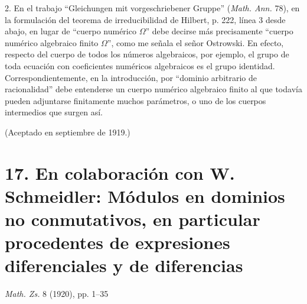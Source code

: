 \documentclass[11pt]{article}
\begin{document}
2. En el trabajo ``Gleichungen mit vorgeschriebener Gruppe'' (\emph{Math. Ann.} 78), en la formulación del teorema de irreducibilidad de Hilbert, p. 222, línea 3 desde abajo, en lugar de ``cuerpo numérico \(\Omega\)'' debe decirse más precisamente ``cuerpo numérico algebraico finito \(\Omega\)'', como me señala el señor Ostrowski. En efecto, respecto del cuerpo de todos los números algebraicos, por ejemplo, el grupo de toda ecuación con coeficientes numéricos algebraicos es el grupo identidad. Correspondientemente, en la introducción, por ``dominio arbitrario de racionalidad'' debe entenderse un cuerpo numérico algebraico finito al que todavía pueden adjuntarse finitamente muchos parámetros, o uno de los cuerpos intermedios que surgen así.

\begin{center}
(Aceptado en septiembre de 1919.)
\end{center}



\clearpage
\providecommand{\mM}{\mathfrak{M}}
\providecommand{\mN}{\mathfrak{N}}
\providecommand{\mL}{\mathfrak{L}}
\providecommand{\mG}{\mathfrak{G}}
\providecommand{\mA}{\mathfrak{A}}
\providecommand{\mB}{\mathfrak{B}}
\providecommand{\mX}{\mathfrak{X}}
\providecommand{\mY}{\mathfrak{Y}}
\providecommand{\mU}{\mathfrak{U}}
\providecommand{\mP}{\mathfrak{P}}
\providecommand{\mQ}{\mathfrak{Q}}
\providecommand{\mS}{\mathfrak{S}}
\providecommand{\mD}{\mathfrak{D}}
\providecommand{\mR}{\mathfrak{R}}
\providecommand{\mV}{\mathfrak{V}}
\providecommand{\ma}{\mathfrak{a}}
\providecommand{\mb}{\mathfrak{b}}
\providecommand{\mx}{\mathfrak{x}}
\providecommand{\my}{\mathfrak{y}}
\providecommand{\mz}{\mathfrak{z}}
\providecommand{\me}{\mathfrak{e}}
\providecommand{\mbarA}{\overline{\mathfrak{A}}}
\providecommand{\mbarB}{\overline{\mathfrak{B}}}
\providecommand{\bara}{\overline{\mathfrak{a}}}
\setcounter{footnote}{0}
\section*{17. En colaboración con W. Schmeidler: Módulos en dominios no conmutativos, en particular procedentes de expresiones diferenciales y de diferencias}
\begin{center}
\emph{Math. Zs.} 8 (1920), pp. 1--35
\end{center}
\end{document}
